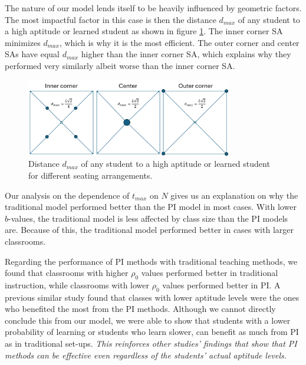 The nature of our model lends itself to be heavily influenced by geometric factors. 
The most impactful factor in this case is then the distance $d_{max}$ of any student to a high aptitude or learned student as shown in figure \ref{fig:SA dmax}. 
The inner corner SA minimizes $d_{max}$, which is why it is the most efficient. 
The outer corner and center SAs have equal $d_{max}$ higher than the inner corner SA, which explains why they performed very similarly albeit worse than the inner corner SA.

\begin{figure}[htbp!]
    \centering
    \includegraphics[width=0.8\textwidth]{figures/SA dmax.png}
    \caption{Distance $d_{max}$ of any student to a high aptitude or learned student for different seating arrangements.}
    \label{fig:SA dmax}
\end{figure}

Our analysis on the dependence of $t_{max}$ on $N$ gives us an explanation on why the traditional model performed better than the PI model in most cases. 
With lower $b$-values, the traditional model is less affected by class size than the PI models are. 
Because of this, the traditional model performed better in cases with larger classrooms. 

Regarding the performance of PI methods with traditional teaching methods, we found that classrooms with higher $\rho_0$ values performed better in traditional instruction, while classrooms with lower $\rho_0$ values performed better in PI. 
A previous similar study \cite{roxas2010seating} found that classes with lower aptitude levels were the ones who benefited the most from the PI methods.
Although we cannot directly conclude this from our model, we were able to show that students with a lower probability of learning or students who learn slower, can benefit as much from PI as in traditional set-ups. 
\textit{This reinforces other studies' findings \cite{lasry2008peer} that show that PI methods can be effective even regardless of the students' actual aptitude levels.}

    
